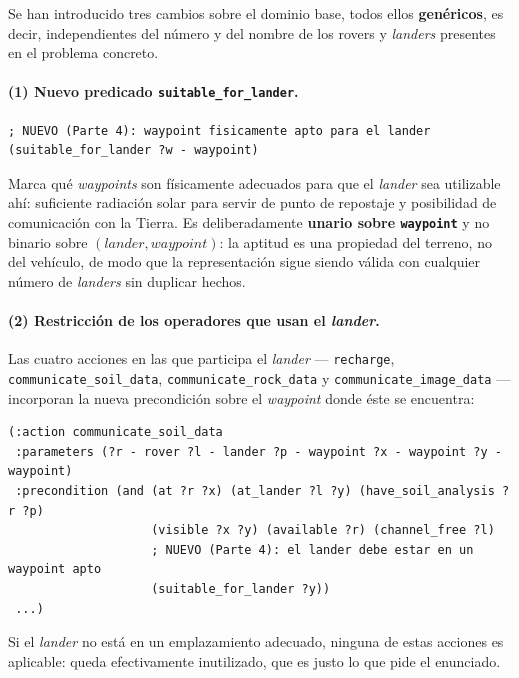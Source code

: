 \documentclass[12pt,a4paper]{article}
\begin{document}
Se han introducido tres cambios sobre el dominio base, todos ellos
\textbf{gen\'ericos}, es decir, independientes del n\'umero y del nombre de
los rovers y \emph{landers} presentes en el problema concreto.

\paragraph{(1) Nuevo predicado \texttt{suitable\_for\_lander}.}

\begin{lstlisting}
; NUEVO (Parte 4): waypoint fisicamente apto para el lander
(suitable_for_lander ?w - waypoint)
\end{lstlisting}

Marca qu\'e \emph{waypoints} son f\'isicamente adecuados para que el
\emph{lander} sea utilizable ah\'i: suficiente radiaci\'on solar para servir
de punto de repostaje y posibilidad de comunicaci\'on con la Tierra. Es
deliberadamente \textbf{unario sobre \texttt{waypoint}} y no binario sobre
$(lander, waypoint)$: la aptitud es una propiedad del terreno, no del
veh\'iculo, de modo que la representaci\'on sigue siendo v\'alida con
cualquier n\'umero de \emph{landers} sin duplicar hechos.

\paragraph{(2) Restricci\'on de los operadores que usan el \emph{lander}.}
Las cuatro acciones en las que participa el \emph{lander} ---
\texttt{recharge}, \texttt{communicate\_soil\_data},
\texttt{communicate\_rock\_data} y \texttt{communicate\_image\_data} ---
incorporan la nueva precondici\'on sobre el \emph{waypoint} donde \'este se
encuentra:

\begin{lstlisting}
(:action communicate_soil_data
 :parameters (?r - rover ?l - lander ?p - waypoint ?x - waypoint ?y - waypoint)
 :precondition (and (at ?r ?x) (at_lander ?l ?y) (have_soil_analysis ?r ?p)
                    (visible ?x ?y) (available ?r) (channel_free ?l)
                    ; NUEVO (Parte 4): el lander debe estar en un waypoint apto
                    (suitable_for_lander ?y))
 ...)
\end{lstlisting}

Si el \emph{lander} no est\'a en un emplazamiento adecuado, ninguna de estas
acciones es aplicable: queda efectivamente inutilizado, que es justo lo que
pide el enunciado.
\end{document}
